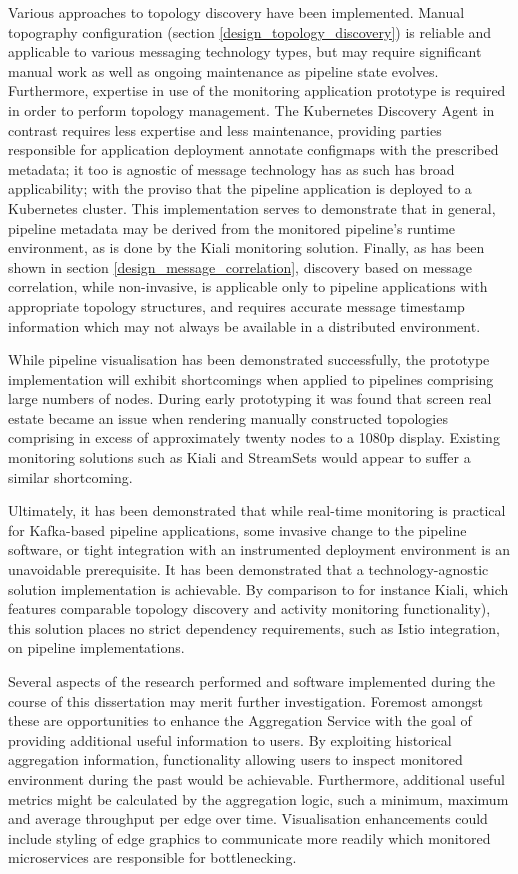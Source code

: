 Various approaches to topology discovery have been implemented. Manual topography configuration (section \ref{design_topology_discovery}) is reliable and applicable to various messaging technology types, but may require significant manual work as well as ongoing maintenance as pipeline state evolves. Furthermore, expertise in use of the monitoring application prototype is required in order to perform topology management. The Kubernetes Discovery Agent in contrast requires less expertise and less maintenance, providing parties responsible for application deployment annotate configmaps with the prescribed metadata; it too is agnostic of message technology has as such has broad applicability; with the proviso that the pipeline application is deployed to a Kubernetes cluster. This implementation serves to demonstrate that in general, pipeline metadata may be derived from the monitored pipeline's runtime environment, as is done by the Kiali monitoring solution. Finally, as has been shown in section \ref{design_message_correlation}, discovery based on message correlation, while non-invasive, is applicable only to pipeline applications with appropriate topology structures, and requires accurate message timestamp information which may not always be available in a distributed environment.

While pipeline visualisation has been demonstrated successfully, the prototype implementation will exhibit shortcomings when applied to pipelines comprising large numbers of nodes. During early prototyping it was found that screen real estate became an issue when rendering manually constructed topologies comprising in excess of approximately twenty nodes to a 1080p display. Existing monitoring solutions such as Kiali and StreamSets would appear to suffer a similar shortcoming.

Ultimately, it has been demonstrated that while real-time monitoring is practical for Kafka-based pipeline applications, some invasive change to the pipeline software, or tight integration with an instrumented deployment environment is an unavoidable prerequisite. It has been demonstrated that a technology-agnostic solution implementation is achievable. By comparison to for instance Kiali, which features comparable topology discovery and activity monitoring functionality), this solution places no strict dependency requirements, such as Istio integration, on pipeline implementations.

Several aspects of the research performed and software implemented during the course of this dissertation may merit further investigation. Foremost amongst these are opportunities to enhance the Aggregation Service with the goal of providing additional useful information to users. By exploiting historical aggregation information, functionality allowing users to inspect monitored environment during the past would be achievable. Furthermore, additional useful metrics might be calculated by the aggregation logic, such a minimum, maximum and average throughput per edge over time. Visualisation enhancements could include styling of edge graphics to communicate more readily which monitored microservices are responsible for bottlenecking. 

